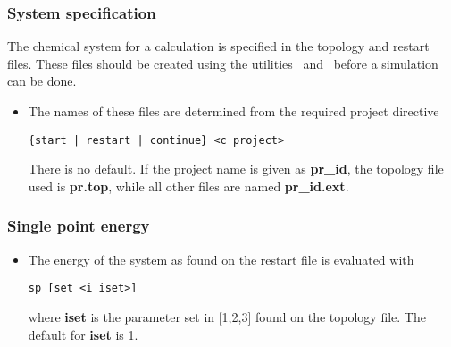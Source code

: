 \subsubsection{System specification}
The chemical system for a calculation is specified in the topology
and restart files. These files should be created using the utilities
\nwtop\ and \nwrst\ before a simulation can be done.
\begin{itemize}
\item
The names of these files are determined from the required project directive
\begin{verbatim}
{start | restart | continue} <c project>
\end{verbatim}
There is no default. If the project name is given as {\bf pr\_id},
the topology file used is {\bf pr.top}, while all other files
are named {\bf pr\_id.ext}.
\end{itemize}
\subsubsection{Single point energy}
\begin{itemize}
\item
The energy of the system as found on the restart file is evaluated with
\begin{verbatim}
sp [set <i iset>]
\end{verbatim}
where {\bf iset} is the parameter set in [1,2,3] found on the
topology file. The default for {\bf iset} is 1.
\end{itemize}
